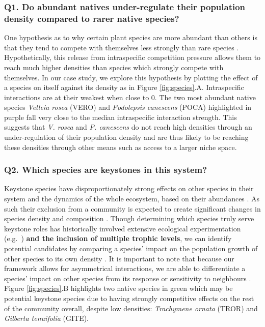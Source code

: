 \documentclass[a4,12pt]{article}
\begin{document}
\begin{refsection}
    \subsubsection*{Q1. Do abundant natives under-regulate their population density compared to rarer native species?}
    One hypothesis as to why certain plant species are more abundant than others is that they tend to compete with themselves less strongly than rare species \parencite{Yenni2012, Yenni2017}. Hypothetically, this release from intraspecific competition pressure allows them to reach much higher densities than species which strongly compete with themselves. In our case study, we explore this hypothesis by plotting the effect of a species on itself against its density as in Figure \ref{fig:species}.A. Intraspecific interactions are at their weakest when close to $0$. The two most abundant native species \textit{Velleia rosea} (VERO) and \textit{Podolepsis canescens} (POCA) highlighted in purple fall very close to the median intraspecific interaction strength. This suggests that \textit{V. rosea} and \textit{P. canescens} do not reach high densities through an under-regulation of their population density and are thus likely to be reaching these densities through other means such as access to a larger niche space. 

    \subsubsection*{Q2. Which species are keystones in this system?}
    Keystone species have disproportionately strong effects on other species in their system and the dynamics of the whole ecosystem, based on their abundances \parencite{Power1996, Piraino2002, Libralato2006}. As such their exclusion from a community is expected to create significant changes in species density and composition \parencite{Paine1969}. Though determining which species truly serve keystone roles has historically involved extensive ecological experimentation (e.g.\ \cite{Paine1992}) \textbf{and the inclusion of multiple trophic levels}, we can identify potential candidates by comparing a species' impact on the population growth of other species to its own density \parencite{Libralato2006}. It is important to note that because our framework allows for asymmetrical interactions, we are able to differentiate a species' impact on other species from its response or sensitivity to neighbours \parencite{Broekman2020}. Figure \ref{fig:species}.B highlights two native species in green which may be potential keystone species due to having strongly competitive effects on the rest of the community overall, despite  low densities: \textit{Trachymene ornata} (TROR) and \textit{Gilberta tenuifolia} (GITE). 
    


\end{refsection}
\end{document}
